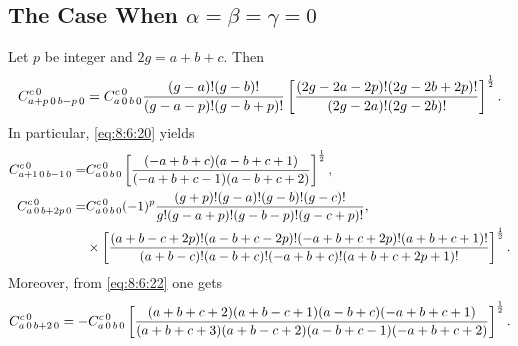 \subsection{The Case When $\alpha=\beta=\gamma=0$}\label{sec:8.6.4}
Let $p$ be integer and $2 g=a+b+c$. Then
\begin{equation}
C_{a+p\,0\,b-p\,0}^{c\,0}=C_{a\,0\,b\,0}^{c\,0} \frac{(g-a)!(g-b)!}{(g-a-p)!(g-b+p)!}\left[\frac{(2 g-2 a-2 p)!(2 g-2 b+2 p)!}{(2 g-2 a)!(2 g-2 b)!}\right]^{\frac{1}{2}}. \label{eq:8:6:20}
\end{equation}
In particular, \eqref{eq:8:6:20} yields
\begin{align}
C_{a+1\,0\,b-1\,0}^{c\,0}=&C_{a\,0\,b\,0}^{c\,0}\left[\frac{(-a+b+c)(a-b+c+1)}{(-a+b+c-1)(a-b+c+2)}\right]^{\frac{1}{2}}, \label{eq:8:6:21}\\
C_{a\,0\,b+2p\,0}^{c\,0}=&C_{a\,0\,b\,0}^{c\,0}(-1)^{p} \frac{(g+p)!(g-a)!(g-b)!(g-c)!}{g!(g-a+p)!(g-b-p)!(g-c+p)!}, \notag\\
&\times\left[\frac{(a+b-c+2 p)!(a-b+c-2 p)!(-a+b+c+2 p)!(a+b+c+1)!}{(a+b-c)!(a-b+c)!(-a+b+c)!(a+b+c+2 p+1)!}\right]^{\frac{1}{2}}. \label{eq:8:6:22}
\end{align}
Moreover, from \eqref{eq:8:6:22} one gets
\begin{equation}
C_{a\,0\,b+2\,0}^{c\,0}=-C_{a\,0\,b\,0}^{c\,0}\left[\frac{(a+b+c+2)(a+b-c+1)(a-b+c)(-a+b+c+1)}{(a+b+c+3)(a+b-c+2)(a-b+c-1)(-a+b+c+2)}\right]^{\frac{1}{2}}. \label{eq:8:6:23}
\end{equation}

